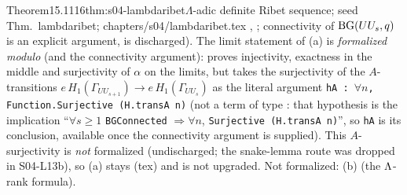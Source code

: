 \begin{quoted}{Theorem}{15.1}{116}{thm:s04-lambdaribet}{$\Lambda$-adic definite Ribet sequence; seed Thm.~lambdaribet; }{chapters/s04/lambdaribet.tex}
, ; connectivity of $\mathrm{BG}(UU_s,q)$ is an explicit
argument,  is discharged). The limit statement of (a) is \emph{formalized modulo }
(and the connectivity argument):  proves injectivity, exactness in the middle and surjectivity of $\alpha$ on the
limits, but takes the surjectivity of the $A$-transitions $e\,H_1(\Gamma_{UU_{s+1}})\to e\,H_1(\Gamma_{UU_s})$ as the literal argument
\texttt{hA : $\forall n$, Function.Surjective (H.transA n)} (not a term of type : that hypothesis is the implication
``$\forall s\ge1$ \texttt{BGConnected} $\Rightarrow\forall n$, \texttt{Surjective (H.transA n)}'', so \texttt{hA} is its conclusion, available once the connectivity argument is supplied). This $A$-surjectivity is \emph{not} formalized (undischarged; the snake-lemma route was dropped in S04-L13b), so
(a) stays \stproved{} (tex) and is not upgraded. Not formalized: (b) (the $\Lambda$-rank formula).
\end{quoted}
